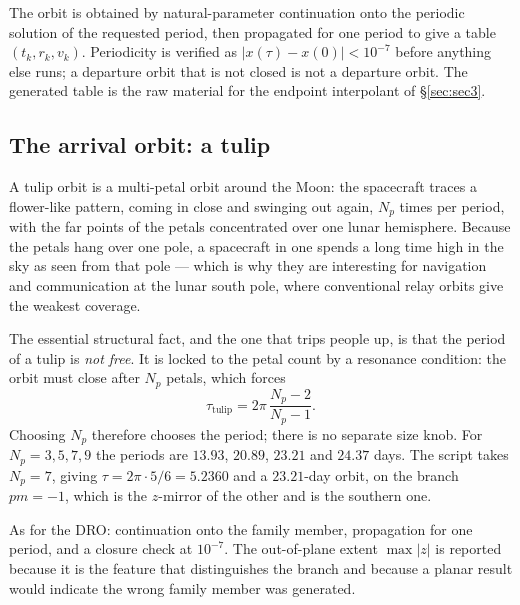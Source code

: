\documentclass[11pt]{article}
\begin{document}
\begin{rig}
The orbit is obtained by natural-parameter continuation onto the periodic
solution of the requested period, then propagated for one period to give a
table $(t_k, r_k, v_k)$. Periodicity is verified as
$|x(\tau) - x(0)| < 10^{-7}$ before anything else runs; a departure orbit that
is not closed is not a departure orbit. The generated table is the raw material
for the endpoint interpolant of \S\ref{sec:sec3}.
\end{rig}

\subsection{The arrival orbit: a tulip}

\begin{eli}
A tulip orbit is a multi-petal orbit around the Moon: the spacecraft traces a
flower-like pattern, coming in close and swinging out again, $N_p$ times per
period, with the far points of the petals concentrated over one lunar
hemisphere. Because the petals hang over one pole, a spacecraft in one spends
a long time high in the sky as seen from that pole --- which is why they are
interesting for navigation and communication at the lunar south pole, where
conventional relay orbits give the weakest coverage.
\end{eli}

\begin{intu}
The essential structural fact, and the one that trips people up, is that the
period of a tulip is \emph{not free}. It is locked to the petal count by a
resonance condition: the orbit must close after $N_p$ petals, which forces
\begin{equation}\label{eq:tulipperiod}
\tau_{\text{tulip}} = 2\pi \, \frac{N_p - 2}{N_p - 1}.
\end{equation}
Choosing $N_p$ therefore chooses the period; there is no separate size knob.
For $N_p = 3, 5, 7, 9$ the periods are $13.93$, $20.89$, $23.21$ and $24.37$
days. The script takes $N_p = 7$, giving $\tau = 2\pi \cdot 5/6 = 5.2360$ and
a $23.21$-day orbit, on the branch $pm = -1$, which is the $z$-mirror of the
other and is the southern one.
\end{intu}

\begin{rig}
As for the DRO: continuation onto the family member, propagation for one
period, and a closure check at $10^{-7}$. The out-of-plane extent
$\max |z|$ is reported because it is the feature that distinguishes the branch
and because a planar result would indicate the wrong family member was
generated.
\end{rig}
\end{document}
